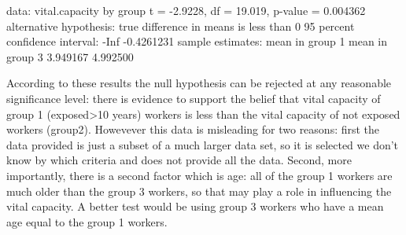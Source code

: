 \documentclass[11pt,letterpaper]{article}
\begin{document}
\begin{enumerate}
\begin{Schunk}
\begin{Soutput}
data:  vital.capacity by group 
t = -2.9228, df = 19.019, p-value = 0.004362
alternative hypothesis: true difference in means is less than 0 
95 percent confidence interval:
       -Inf -0.4261231 
sample estimates:
mean in group 1 mean in group 3 
       3.949167        4.992500 
\end{Soutput}
\end{Schunk}
According to these results the null hypothesis can be rejected at any reasonable significance level: there is evidence to support the belief that vital capacity of group 1 (exposed>10 years) workers is less than the vital capacity of not exposed workers (group2). Howevever this data is misleading for two reasons: first the data provided is just a subset of a much larger data set, so it is selected we don't know by which criteria and does not provide all the data. Second, more importantly, there is a second factor which is age: all of the group 1 workers are much older than the group 3 workers, so that may play a role in influencing the vital capacity. A better test would be using group 3 workers who have a mean age equal to the group 1 workers.

\end{enumerate}
\end{document}
